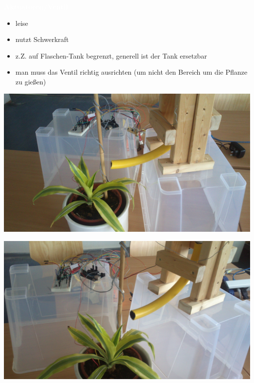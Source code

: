 \documentclass[bigger]{beamer}
\newcommand{\topic}[1]{{\huge{\textcolor{white}{\textbf{#1}}}}}
\begin{document}
\begin{frame}{\topic{Aktuatoren/Ventil}}
	\begin{itemize}
		\item leise
		\item nutzt Schwerkraft
		\item z.Z. auf Flaschen-Tank begrenzt, generell ist der Tank ersetzbar
		\item man muss das Ventil richtig ausrichten (um nicht den Bereich um die Pflanze zu gießen)
	\end{itemize}
\end{frame}

\begin{frame}
\includegraphics[width=\linewidth]{board_final.jpg}
\end{frame}

\begin{frame}
\includegraphics[width=\linewidth]{board_plant.jpg}
\end{frame}
\end{document}
